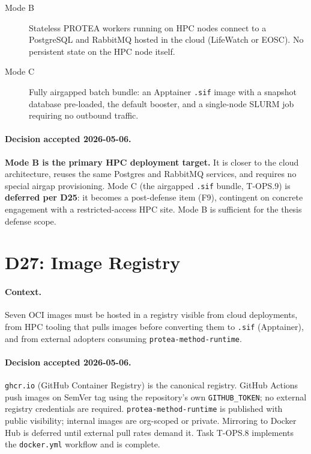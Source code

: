 \begin{description}
  \item[Mode B] Stateless PROTEA workers running on HPC nodes connect to a
    PostgreSQL and RabbitMQ hosted in the cloud (LifeWatch or EOSC). No
    persistent state on the HPC node itself.
  \item[Mode C] Fully airgapped batch bundle: an Apptainer \texttt{.sif}
    image with a snapshot database pre-loaded, the default booster, and a
    single-node SLURM job requiring no outbound traffic.
\end{description}

\paragraph{Decision accepted 2026-05-06.}
\textbf{Mode B is the primary HPC deployment target.} It is closer to the
cloud architecture, reuses the same Postgres and RabbitMQ services, and
requires no special airgap provisioning. Mode C (the airgapped \texttt{.sif}
bundle, T-OPS.9) is \textbf{deferred per D25}: it becomes a post-defense
item (F9), contingent on concrete engagement with a restricted-access HPC
site. Mode B is sufficient for the thesis defense scope.

\section{D27: Image Registry}
\label{app:adr-d27}

\paragraph{Context.}
Seven OCI images must be hosted in a registry visible from cloud deployments,
from HPC tooling that pulls images before converting them to \texttt{.sif}
(Apptainer), and from external adopters consuming
\texttt{protea-method-runtime}.

\paragraph{Decision accepted 2026-05-06.}
\texttt{ghcr.io} (GitHub Container Registry) is the canonical registry.
GitHub Actions push images on SemVer tag using the repository's own
\texttt{GITHUB\_TOKEN}; no external registry credentials are required.
\texttt{protea-method-runtime} is published with public visibility; internal
images are org-scoped or private. Mirroring to Docker Hub is deferred until
external pull rates demand it. Task T-OPS.8 implements the \texttt{docker.yml}
workflow and is complete.

